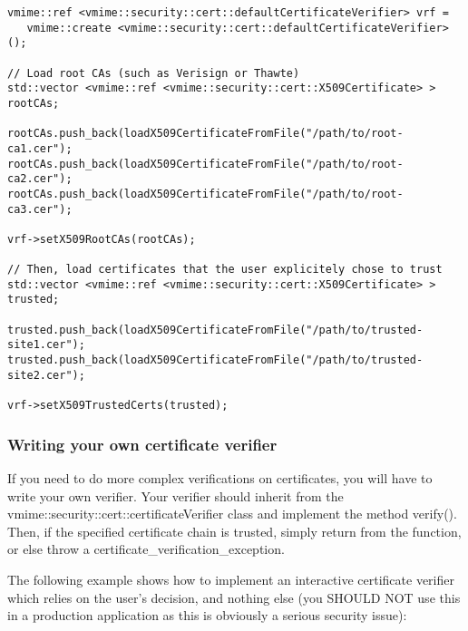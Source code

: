 \begin{lstlisting}[caption={Using the default certificate verifier}]
vmime::ref <vmime::security::cert::defaultCertificateVerifier> vrf =
   vmime::create <vmime::security::cert::defaultCertificateVerifier>();

// Load root CAs (such as Verisign or Thawte)
std::vector <vmime::ref <vmime::security::cert::X509Certificate> > rootCAs;

rootCAs.push_back(loadX509CertificateFromFile("/path/to/root-ca1.cer");
rootCAs.push_back(loadX509CertificateFromFile("/path/to/root-ca2.cer");
rootCAs.push_back(loadX509CertificateFromFile("/path/to/root-ca3.cer");

vrf->setX509RootCAs(rootCAs);

// Then, load certificates that the user explicitely chose to trust
std::vector <vmime::ref <vmime::security::cert::X509Certificate> > trusted;

trusted.push_back(loadX509CertificateFromFile("/path/to/trusted-site1.cer");
trusted.push_back(loadX509CertificateFromFile("/path/to/trusted-site2.cer");

vrf->setX509TrustedCerts(trusted);
\end{lstlisting}


\subsubsection{Writing your own certificate verifier} %

If you need to do more complex verifications on certificates, you will have to
write your own verifier. Your verifier should inherit from the
{\vcode vmime::security::cert::certificateVerifier} class and implement the
method {\vcode verify()}. Then, if the specified certificate chain is trusted,
simply return from the function, or else throw a
{\vcode certificate\_verification\_exception}.

The following example shows how to implement an interactive certificate
verifier which relies on the user's decision, and nothing else (you SHOULD NOT
use this in a production application as this is obviously a serious security
issue):

